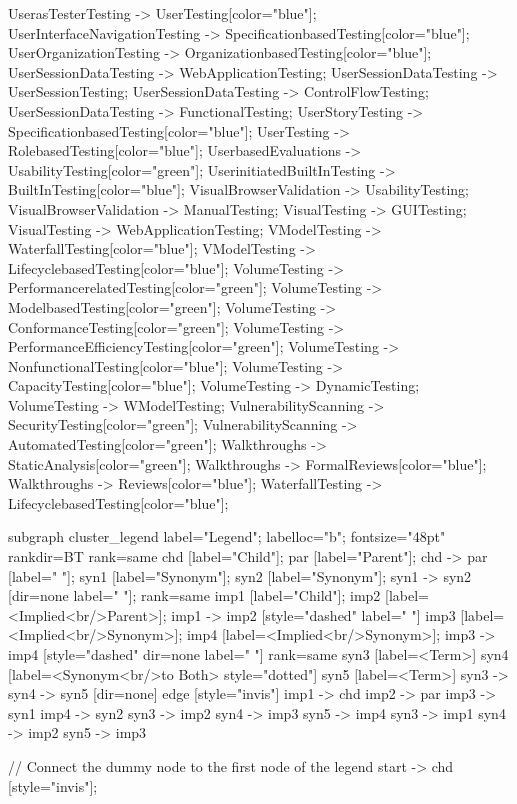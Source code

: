 \documentclass{article}
\begin{document}
{UserasTesterTesting -> UserTesting[color="blue"];
UserInterfaceNavigationTesting -> SpecificationbasedTesting[color="blue"];
UserOrganizationTesting -> OrganizationbasedTesting[color="blue"];
UserSessionDataTesting -> WebApplicationTesting;
UserSessionDataTesting -> UserSessionTesting;
UserSessionDataTesting -> ControlFlowTesting;
UserSessionDataTesting -> FunctionalTesting;
UserStoryTesting -> SpecificationbasedTesting[color="blue"];
UserTesting -> RolebasedTesting[color="blue"];
UserbasedEvaluations -> UsabilityTesting[color="green"];
UserinitiatedBuiltInTesting -> BuiltInTesting[color="blue"];
VisualBrowserValidation -> UsabilityTesting;
VisualBrowserValidation -> ManualTesting;
VisualTesting -> GUITesting;
VisualTesting -> WebApplicationTesting;
VModelTesting -> WaterfallTesting[color="blue"];
VModelTesting -> LifecyclebasedTesting[color="blue"];
VolumeTesting -> PerformancerelatedTesting[color="green"];
VolumeTesting -> ModelbasedTesting[color="green"];
VolumeTesting -> ConformanceTesting[color="green"];
VolumeTesting -> PerformanceEfficiencyTesting[color="green"];
VolumeTesting -> NonfunctionalTesting[color="blue"];
VolumeTesting -> CapacityTesting[color="blue"];
VolumeTesting -> DynamicTesting;
VolumeTesting -> WModelTesting;
VulnerabilityScanning -> SecurityTesting[color="green"];
VulnerabilityScanning -> AutomatedTesting[color="green"];
Walkthroughs -> StaticAnalysis[color="green"];
Walkthroughs -> FormalReviews[color="blue"];
Walkthroughs -> Reviews[color="blue"];
WaterfallTesting -> LifecyclebasedTesting[color="blue"];

subgraph cluster_legend {
    label="Legend";
    labelloc="b";
    fontsize="48pt"
    rankdir=BT
    {
        rank=same
        chd [label="Child"];
        par [label="Parent"];
        chd -> par [label="                "];
        syn1 [label="Synonym"];
        syn2 [label="Synonym"];
        syn1 -> syn2 [dir=none label="                "];
    }
    {
        rank=same
        imp1 [label="Child"];
        imp2 [label=<Implied<br/>Parent>];
        imp1 -> imp2 [style="dashed" label="                "]
        imp3 [label=<Implied<br/>Synonym>];
        imp4 [label=<Implied<br/>Synonym>];
        imp3 -> imp4 [style="dashed" dir=none label="                "]
    }
    {
        rank=same
        syn3 [label=<Term>]
        syn4 [label=<Synonym<br/>to Both> style="dotted"]
        syn5 [label=<Term>]
        syn3 -> syn4 -> syn5 [dir=none]
    }
    edge [style="invis"]
    imp1 -> chd
    imp2 -> par
    imp3 -> syn1
    imp4 -> syn2
syn3 -> imp2
syn4 -> imp3
syn5 -> imp4
syn3 -> imp1
syn4 -> imp2
syn5 -> imp3
}

// Connect the dummy node to the first node of the legend
start -> chd [style="invis"];
}
\end{document}
